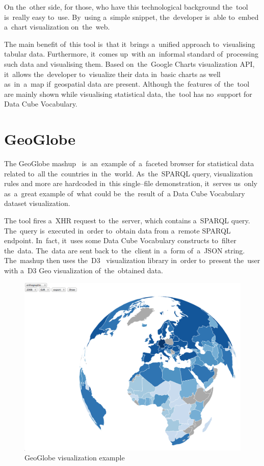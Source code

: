 On the~other side, for those, who have this technological background the~tool is~really easy to~use. By~using a~simple snippet, the~developer is~able to~embed a~chart visualization on~the~web.

The main benefit of~this tool is~that it~brings a~unified approach to~visualising tabular data. Furthermore, it~comes up~with an~informal standard of~processing such data and visualising them. Based on~the~Google Charts visualization 
API, it~allows the~developer to~visualize their data in~basic charts 
as well as~in~a~map if~geospatial data are present. Although the~features of~the~tool are mainly shown while visualising statistical data, the~tool has no~support for 
Data Cube Vocabulary.

\section{GeoGlobe}
The GeoGlobe mashup~\cite{geoglobe} is~an~example of~a~faceted browser for 
statistical data related to~all the~countries in~the~world. As~the~SPARQL 
query, visualization rules and more are hardcoded in~this single--file 
demonstration, it~serves us~only as~a~great example of~what could be~the~result of~a
Data Cube Vocabulary dataset visualization.

The tool fires a~XHR request to~the~server, which contains a~SPARQL query. The~query is~executed in~order to~obtain data from a~remote SPARQL endpoint. In~fact, it~uses some Data Cube Vocabulary constructs to~filter the~data. The~data 
are sent back to~the~client in~a~form of~a~JSON string. The~mashup then uses the~D3~\cite{d3} visualization library in~order to~present the~user with a~D3 Geo 
visualization of~the~obtained data.

\begin{figure}
	\centering
	\includegraphics[width=140mm]{img/geoglobe.png}
	\caption{GeoGlobe visualization example}
	\label{fig:geoglobe}
\end{figure}


